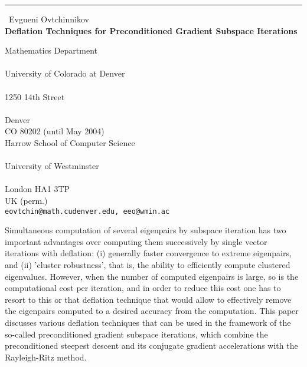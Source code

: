 \documentclass{report}
\begin{document}
\begin{center}
\rule{6in}{1pt} \
{\large Evgueni Ovtchinnikov \\
{\bf Deflation Techniques for Preconditioned Gradient Subspace Iterations}}

Mathematics Department \\ \\ University of Colorado at Denver \\ \\ 1250 14th Street \\ \\ Denver \\ CO 80202 (until May 2004) \\ Harrow School of Computer Science \\ \\ University of Westminster \\ \\ London HA1 3TP \\ UK (perm.)
\\
{\tt eovtchin@math.cudenver.edu, eeo@wmin.ac}\end{center}

Simultaneous computation of several eigenpairs by subspace iteration has
two important advantages over computing them successively by single
vector iterations with deflation: (i) generally faster convergence to
extreme eigenpairs, and (ii) 'cluster robustness', that is, the ability
to efficiently compute clustered eigenvalues. However, when the number of
computed eigenpairs is large, so is the computational cost per iteration,
and in order to reduce this cost one has to resort to this or that
deflation technique that would allow to effectively remove the eigenpairs
computed to a desired accuracy from the computation. This paper discusses
various deflation techniques that can be used in the framework of the
so-called preconditioned gradient subspace iterations, which combine the
preconditioned steepest descent and its conjugate gradient accelerations
with the Rayleigh-Ritz method.
\end{document}
